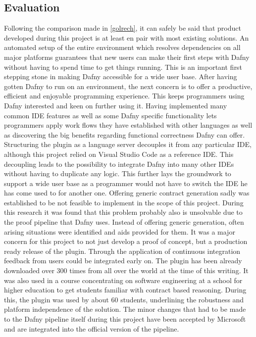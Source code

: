 \subsection{Evaluation}\label{evaluation}
Following the comparison made in \ref{golrech}, it can safely be said that product developed during this project is at least en pair with most existing solutions. An automated setup of the entire environment which resolves dependencies on all major platforms guarantees that new users can make their first steps with Dafny without having to spend time to get things running. This is an important first stepping stone in making Dafny accessible for a wide user base. \newline
After having gotten Dafny to run on an environment, the next concern is to offer a productive, efficient and enjoyable programming experience. This keeps programmers using Dafny interested and keen on further using it. Having implemented many common IDE features as well as some Dafny specific functionality lets programmers apply work flows they have established with other languages as well as discovering the big benefits regarding functional correctness Dafny can offer. \newline
Structuring the plugin as a language server decouples it from any particular IDE, although this project relied on Visual Studio Code as a reference IDE. This decoupling leads to the possibility to integrate Dafny into many other IDEs without having to duplicate any logic. This further lays the groundwork to support a wide user base as a programmer would not have to switch the IDE he has come used to for another one. \newline
Offering generic contract generation sadly was established to be not feasible to implement in the scope of this project. During this research it was found that this problem probably also is unsolvable due to the proof pipeline that Dafny uses. Instead of offering generic generation, often arising situations were identified and aids provided for them.\newline
It was a major concern for this project to not just develop a proof of concept, but a production ready release of the plugin. Through the application of continuous integration feedback from users could be integrated early on. The plugin has been already downloaded over 300 times from all over the world at the time of this writing. It was also used in a course concentrating on software engineering at a school for higher education to get students familiar with contract based reasoning. During this, the plugin was used by about 60 students, underlining the robustness and platform independence of the solution. The minor changes that had to be made to the Dafny pipeline itself during this project have been accepted by Microsoft and are integrated into the official version of the pipeline. \newline
